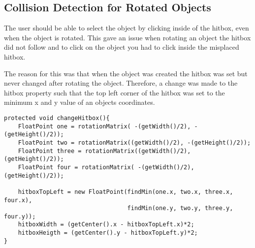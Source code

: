 \subsection{Collision Detection for Rotated Objects}
The user should be able to select the object by clicking inside of the hitbox, even when the object is rotated.
This gave an issue when rotating an object the hitbox did not follow and to click on the object you had to click inside the misplaced hitbox.

The reason for this was that when the object was created the hitbox was set but never changed after rotating the object.
Therefore, a change was made to the hitbox property such that the top left corner of the hitbox was set to the minimum x and y value of an objects coordinates.


\begin{lstlisting}
protected void changeHitbox(){
	FloatPoint one = rotationMatrix( -(getWidth()/2), -(getHeight()/2));
	FloatPoint two = rotationMatrix((getWidth()/2), -(getHeight()/2));
	FloatPoint three = rotationMatrix((getWidth()/2), (getHeight()/2));
	FloatPoint four = rotationMatrix( -(getWidth()/2), (getHeight()/2));
	
	hitboxTopLeft = new FloatPoint(findMin(one.x, two.x, three.x, four.x),
	                               findMin(one.y, two.y, three.y, four.y));
	hitboxWidth = (getCenter().x - hitboxTopLeft.x)*2;
	hitboxHeigth = (getCenter().y - hitboxTopLeft.y)*2;
}
\end{lstlisting}



